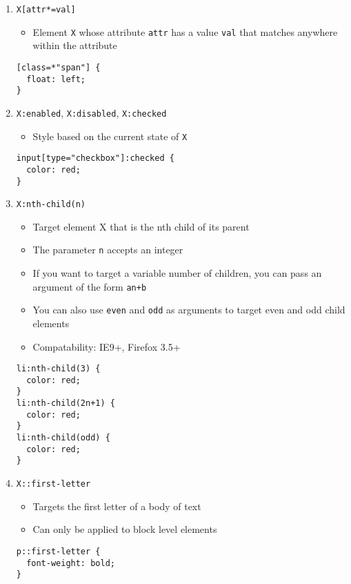\documentclass[10pt, twocolumn]{article}
\begin{document}
\begin{enumerate}
\item \texttt{X[attr*=val]}
\begin{itemize}
\item Element \texttt{X} whose attribute \texttt{attr} has a value \texttt{val} that matches anywhere within the attribute 
\end{itemize}
\begin{lstlisting}[frame=single]
[class=*"span"] {
  float: left;
}
\end{lstlisting}

\item \texttt{X:enabled}, \texttt{X:disabled}, \texttt{X:checked} 
\begin{itemize}
\item Style based on the current state of \texttt{X}  
\end{itemize}
\begin{lstlisting}[frame=single]
input[type="checkbox"]:checked {
  color: red;
}
\end{lstlisting}

\item \texttt{X:nth-child(n)} 
\begin{itemize}
\item Target element X that is the nth child of its parent
\item The parameter \texttt{n} accepts an integer
\item If you want to target a variable number of children, you can pass an argument of the form \texttt{an+b}
\item You can also use \texttt{even} and \texttt{odd} as arguments to target even and odd child elements
\item Compatability: IE9+, Firefox 3.5+
\end{itemize}
\begin{lstlisting}[frame=single]
li:nth-child(3) {
  color: red;
}
li:nth-child(2n+1) {
  color: red;
}
li:nth-child(odd) {
  color: red;
}
\end{lstlisting}

\item \texttt{X::first-letter} 
\begin{itemize}
\item Targets the first letter of a body of text
\item Can only be applied to block level elements
\end{itemize}
\begin{lstlisting}[frame=single]
p::first-letter {
  font-weight: bold;
}
\end{lstlisting}

\end{enumerate}
\end{document}
